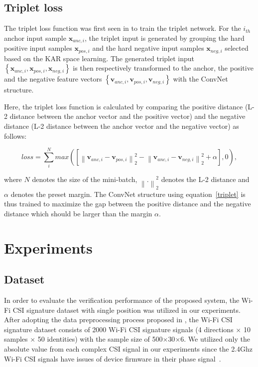 \documentclass[runningheads]{llncs}
\begin{document}

\subsection{Triplet loss}

The triplet loss function was first seen in \cite{hoffer2015deep} to train the triplet network.
For the $i_{th}$ anchor input sample $\mathbf{x}_{anc,i}$, the triplet input is generated by grouping the hard positive input samples $\mathbf{x}_{pos,i}$ and the hard negative input samples $\mathbf{x}_{neg,i}$ selected based on the KAR space learning. The generated triplet input $\left\{\mathbf{x}_{anc,i},\mathbf{x}_{pos,i},\mathbf{x}_{neg,i}\right\}$ is then respectively transformed to the anchor, the positive and the negative feature vectors $\left\{\mathbf{v}_{anc,i},\mathbf{v}_{pos,i},\mathbf{v}_{neg,i}\right\}$ with the ConvNet structure.

Here, the triplet loss function is calculated by comparing the positive distance (L-2 distance between the anchor vector and the positive vector) and the negative distance (L-2 distance between the anchor vector and the negative vector) as follows:

\begin{equation}
    loss = \sum_i^N max\left({ \left[ {\left\| {{\mathbf{v}_{anc,i}} - {\mathbf{v}_{pos,i}}} \right\|_2^2} - {\left\| {{\mathbf{v}_{anc,i}} - {\mathbf{v}_{neg,i}}} \right\|_2^2}  + \alpha \right]}, 0 \right),\label{triplet}
\end{equation} 

where $N$ denotes the size of the mini-batch, ${\left\| . \right\|_2^2}$ denotes the L-2 distance and $\alpha$ denotes the preset margin.
The ConvNet structure using equation~\eqref{triplet} is thus trained to maximize the gap between the positive distance and the negative distance which should be larger than the margin $\alpha$.

\section{Experiments}

\subsection{Dataset}
 In order to evaluate the verification performance of the proposed system, the Wi-Fi CSI signature dataset \cite{moon2017air} with single position was utilized in our experiments. After adopting the data preprocessing process proposed in \cite{moon2017air}, the Wi-Fi CSI signature dataset consists of 2000 Wi-Fi CSI signature signals (4 directions $\times$ 10 samples $\times$ 50 identities) with the sample size of 500$\times$30$\times$6. We utilized only the absolute value from each complex CSI signal in our experiments since the 2.4Ghz Wi-Fi CSI signals have issues of device firmware in their phase signal~\cite{wang2015understanding}.
\end{document}

